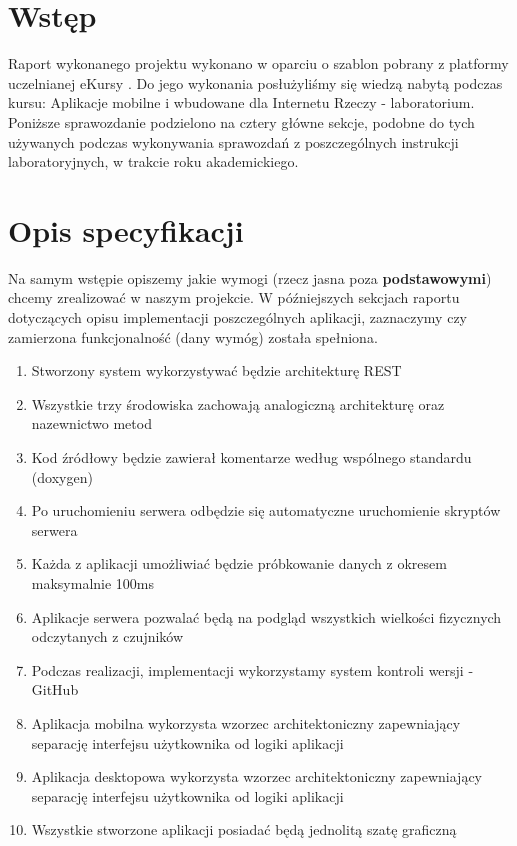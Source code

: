 \documentclass[11pt, a4paper]{article}
\institute{Instytut Robotyki i Inteligencji Maszynowej}
\date{01-07-2021}
\begin{document}
\mainpage
\newpage

\tableofcontents
\thispagestyle{fancy}
\newpage

\section*{Wstęp} 
Raport wykonanego projektu wykonano w oparciu o szablon pobrany z platformy uczelnianej eKursy \cite{ekursy}. Do jego wykonania posłużyliśmy się wiedzą nabytą podczas kursu: Aplikacje mobilne i wbudowane dla Internetu Rzeczy - laboratorium. \\
Poniższe sprawozdanie podzielono na cztery główne sekcje, podobne do tych używanych podczas wykonywania sprawozdań z poszczególnych instrukcji laboratoryjnych, w trakcie roku akademickiego.

\section{Opis specyfikacji}
Na samym wstępie opiszemy jakie wymogi (rzecz jasna poza \textbf{podstawowymi}) chcemy zrealizować w naszym projekcie. W późniejszych sekcjach raportu dotyczących opisu implementacji poszczególnych aplikacji, zaznaczymy czy zamierzona funkcjonalność (dany wymóg) została spełniona.
\begin{enumerate}
\item Stworzony system wykorzystywać będzie architekturę REST
\item Wszystkie trzy środowiska zachowają analogiczną architekturę oraz nazewnictwo metod
\item Kod źródłowy będzie zawierał komentarze według wspólnego standardu (doxygen)
\item Po uruchomieniu serwera odbędzie się automatyczne uruchomienie skryptów serwera
\item Każda z aplikacji umożliwiać będzie próbkowanie danych z okresem maksymalnie 100ms
\item Aplikacje serwera pozwalać będą na podgląd wszystkich wielkości fizycznych odczytanych z czujników
\item Podczas realizacji, implementacji wykorzystamy system kontroli wersji - GitHub
\item Aplikacja mobilna wykorzysta wzorzec architektoniczny zapewniający separację interfejsu użytkownika od logiki aplikacji
\item Aplikacja desktopowa wykorzysta wzorzec architektoniczny zapewniający separację interfejsu użytkownika od logiki aplikacji
\item Wszystkie stworzone aplikacji posiadać będą jednolitą szatę graficzną
\end{enumerate}
\end{document}
